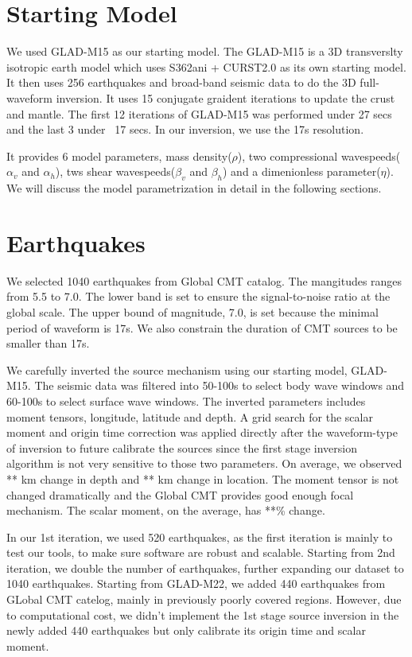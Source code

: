 \documentclass[extra,mreferee]{gji}
\begin{document}
\section{Starting Model}

We used GLAD-M15 as our starting model. The GLAD-M15 is a 3D transverslty isotropic earth model which uses S362ani + CURST2.0 as its own starting model. It then uses 256 earthquakes and broad-band seismic data to do the 3D full-waveform inversion\cite{Ebru2015}. It uses 15 conjugate graident iterations to update the crust and mantle. The first 12 iterations of GLAD-M15 was performed under 27 secs and the last 3 under ~17 secs. In our inversion, we use the 17s resolution.

It provides 6 model parameters, mass density($\rho$), two compressional wavespeeds($\alpha_v$ and $\alpha_h$), tws shear wavespeeds($\beta_v$ and $\beta_h$) and a dimenionless parameter($\eta$). We will discuss the model parametrization in detail in the following sections.

\section{Earthquakes}
We selected 1040 earthquakes from Global CMT catalog. The mangitudes ranges from 5.5 to 7.0. The lower band is set to ensure the signal-to-noise ratio at the global scale. The upper bound of magnitude, 7.0, is set because the minimal period of waveform is 17s. We also constrain the duration of CMT sources to be smaller than 17s.

We carefully inverted the source mechanism using our starting model, GLAD-M15. The seismic data was filtered into 50-100s to select body wave windows and 60-100s to select surface wave windows\cite{globalCMT}. The inverted parameters includes moment tensors, longitude, latitude and depth. A grid search for the scalar moment and origin time correction was applied directly after the waveform-type of inversion to future calibrate the sources since the first stage inversion algorithm is not very sensitive to those two parameters.
On average, we observed ** km change in depth and ** km change in location. The moment tensor is not changed dramatically and the Global CMT provides good enough focal mechanism. The scalar moment, on the average, has **\% change.

In our 1st iteration, we used 520 earthquakes, as the first iteration is mainly to test our tools, to make sure software are robust and scalable. Starting from 2nd iteration, we double the number of earthquakes, further expanding our dataset to 1040 earthquakes. Starting from GLAD-M22, we added 440 earthquakes from GLobal CMT catelog, mainly in previously poorly covered regions. However, due to computational cost, we didn't implement the 1st stage source inversion in the newly added 440 earthquakes but only calibrate its origin time and scalar moment.
\end{document}
